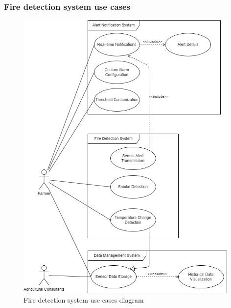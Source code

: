 \subsubsection*{Fire detection system use cases}
\begin{figure}[H]
    \centering
    \includegraphics[width=0.98\textwidth]{./images/6/fire_uses.png}
    \caption{Fire detection system use cases diagram}
\end{figure}
